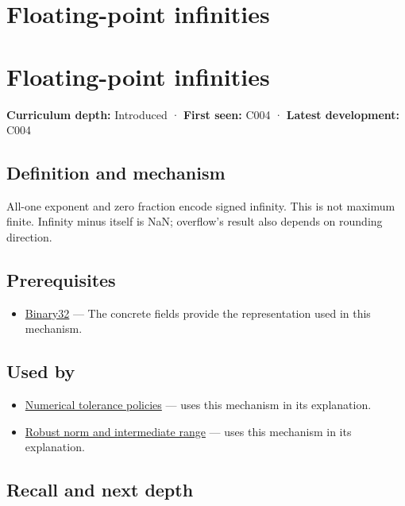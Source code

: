 \hypertarget{appendix-eb336149c00a}{}
\section*{Floating-point infinities}
\section{Floating-point infinities}\label{floating-point-infinities}

\textbf{Curriculum depth:} Introduced · \textbf{First seen:} C004 · \textbf{Latest development:} C004

\subsection{Definition and mechanism}\label{definition-and-mechanism}

All-one exponent and zero fraction encode signed infinity. This is not maximum finite. Infinity minus itself is NaN; overflow's result also depends on rounding direction.

\subsection{Prerequisites}\label{prerequisites}

\begin{itemize}
\tightlist
\item
  \hyperref[appendix-5057f9ad327f]{Binary32} --- The concrete fields provide the representation used in this mechanism.
\end{itemize}

\subsection{Used by}\label{used-by}

\begin{itemize}
\tightlist
\item
  \hyperref[appendix-0ec599f8ba27]{Numerical tolerance policies} --- uses this mechanism in its explanation.
\item
  \hyperref[appendix-7f1e17dcafb1]{Robust norm and intermediate range} --- uses this mechanism in its explanation.
\end{itemize}

\subsection{Recall and next depth}\label{recall-and-next-depth}

